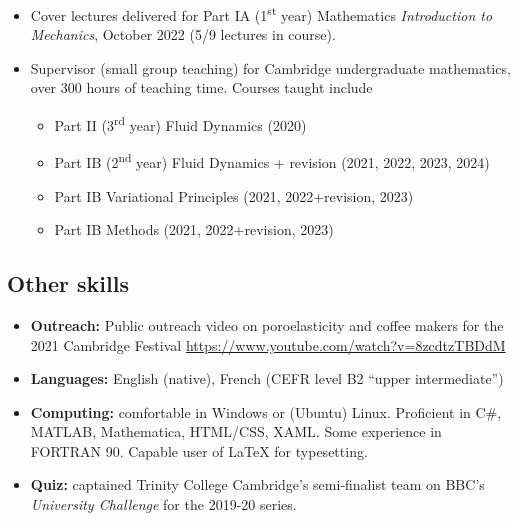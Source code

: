 \documentclass[a4paper]{article}
\begin{document}
\begin{multicols}{2}
\begin{itemize}
\begin{multicols}{2}
\begin{small}
                        \end{small}
                    \end{multicols}
                \item Cover lectures delivered for Part IA (1\textsuperscript{st} year) Mathematics \textit{Introduction to Mechanics}, October 2022 (5/9 lectures in course).\vspace{-0.5em}
                \item Supervisor (small group teaching) for Cambridge undergraduate mathematics, over 300 hours of teaching time. Courses taught include \vspace{-0.5em}
                \begin{small}
                    \begin{itemize}
                        \item Part II (3\textsuperscript{rd} year) Fluid Dynamics (2020)\vspace{-0.5em}
                        \item Part IB (2\textsuperscript{nd} year) Fluid Dynamics + revision (2021, 2022, 2023, 2024)\vspace{-0.5em}
                        \item Part IB Variational Principles (2021, 2022+revision, 2023)\vspace{-0.5em}
                        \item Part IB Methods (2021, 2022+revision, 2023)\vspace{-0.5em}
                    \end{itemize}
                \end{small}
            \end{itemize}
            \newcolumn
        \subsection*{Other skills}
            \begin{itemize}
                \item \textbf{Outreach:} Public outreach video on poroelasticity and coffee makers for the 2021 Cambridge Festival \href{https://www.youtube.com/watch?v=8zcdtzTBDdM}{https://www.youtube.com/watch?v=8zcdtzTBDdM}
                \item \textbf{Languages:} English (native), French (CEFR level B2 ``upper intermediate'')
                \item \textbf{Computing:} comfortable in Windows or (Ubuntu) Linux. Proficient in C\#, MATLAB, Mathematica, HTML/CSS, XAML. Some experience in FORTRAN 90. Capable user of \LaTeX  \; for typesetting.
                \item \textbf{Quiz:}  captained Trinity College Cambridge's semi-finalist team on BBC's \emph{University Challenge} for the 2019-20 series.
            \end{itemize}

\end{multicols}
\end{document}
